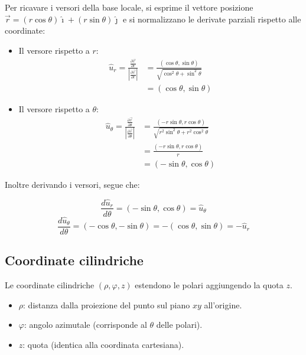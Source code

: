 \documentclass[11pt, a4paper, openright]{book}
\theoremstyle{plain}
\theoremstyle{definition}
\begin{document}
Per ricavare i versori della base locale, si esprime il vettore posizione $\vec{r} = (r\cos\theta)\hat{\imath} + (r\sin\theta)\hat{\jmath}$ e si normalizzano le derivate parziali rispetto alle coordinate:
\begin{itemize}
    \item Il versore rispetto a $r$:
        \begin{align}
            \hat{u}_r = \frac{\frac{\partial \vec{r}}{\partial r}}{\left|\frac{\partial \vec{r}}{\partial r}\right|} & = \frac{(\cos\theta, \sin\theta)}{\sqrt{\cos^2\theta + \sin^2\theta}} \\
            & = (\cos\theta, \sin\theta)
        \end{align}
    \item Il versore rispetto a $\theta$:
        \begin{align}
            \hat{u}_\theta = \frac{\frac{\partial \vec{r}}{\partial \theta}}{\left|\frac{\partial \vec{r}}{\partial \theta}\right|} & = \frac{(-r\sin\theta, r\cos\theta)}{\sqrt{r^2\sin^2\theta + r^2\cos^2\theta}} \\ 
            & = \frac{(-r\sin\theta, r\cos\theta)}{r} \\ 
            & = (-\sin\theta, \cos\theta)
        \end{align}
\end{itemize}

Inoltre derivando i versori, segue che:

\[\frac{d\hat{u}_r}{d\theta} = (-\sin\theta, \cos\theta) = \hat{u}_\theta\]
\[\frac{d\hat{u}_\theta}{d\theta} = (-\cos\theta, -\sin\theta) = -(\cos\theta, \sin\theta) = -\hat{u}_r\]

\subsection{Coordinate cilindriche}

Le coordinate cilindriche $(\rho, \varphi, z)$ estendono le polari aggiungendo la quota $z$.
\begin{itemize}
    \item $\rho$: distanza dalla proiezione del punto sul piano $xy$ all'origine.
    \item $\varphi$: angolo azimutale (corrisponde al $\theta$ delle polari).
    \item $z$: quota (identica alla coordinata cartesiana).
\end{itemize}
\end{document}
